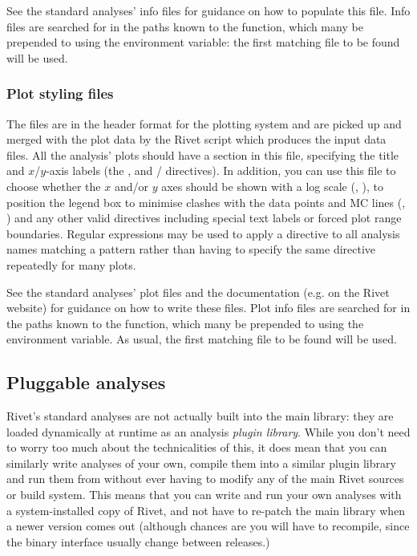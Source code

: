 \documentclass{JHEP3}
\begin{document}
See the standard analyses' info files for guidance on how to populate this
file. Info files are searched for in the paths known to the
 function, which many be prepended to using
the  environment variable: the first matching file to be
found will be used.


\subsubsection{Plot styling files}

The  files are in the header format for the  plotting
system and are picked up and merged with the plot data by the Rivet
 script which produces the  input data
files. All the analysis' plots should have a 
section in this file, specifying the title and $x$/$y$-axis labels (the
, and / directives). In addition, you can use
this file to choose whether the $x$ and/or $y$ axes should be shown with a log
scale (, ), to position the legend box to minimise clashes
with the data points and MC lines (, ) and any
other valid  directives including special text labels or forced
plot range boundaries. Regular expressions may be used to apply a directive to
all analysis names matching a pattern rather than having to specify the same
directive repeatedly for many plots.

See the standard analyses' plot files and the  documentation
(e.g. on the Rivet website) for guidance on how to write these files. Plot info
files are searched for in the paths known to the
 function, which many be prepended to using
the  environment variable. As usual, the first matching
file to be found will be used.



\subsection{Pluggable analyses}

Rivet's standard analyses are not actually built into the main 
library: they are loaded dynamically at runtime as an analysis \emph{plugin
  library}. While you don't need to worry too much about the technicalities of
this, it does mean that you can similarly write analyses of your own, compile
them into a similar plugin library and run them from  without ever
having to modify any of the main Rivet sources or build system. This means that
you can write and run your own analyses with a system-installed copy of Rivet,
and not have to re-patch the main library when a newer version comes out
(although chances are you will have to recompile, since the binary interface usually
change between releases.)
\end{document}
